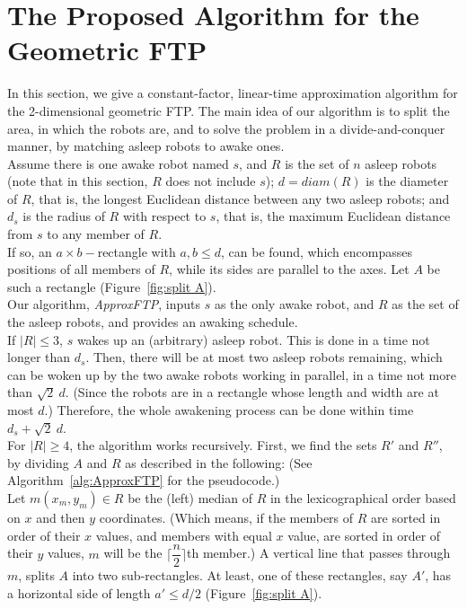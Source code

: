 \documentclass[review]{elsarticle}
\begin{document}
\section{The Proposed Algorithm for the Geometric FTP}
In this section, we give a constant-factor, linear-time approximation algorithm for the 2-dimensional geometric FTP. The main idea of our algorithm is to split the area, in which the robots are, and to solve the problem in a divide-and-conquer manner, by matching asleep robots to awake ones.\\
Assume there is one awake robot named $s$, and $R$ is the set of $n$ asleep robots (note that in this section, $R$ does not include $s$); $d=diam(R)$ is the diameter of $R$, that is, the longest Euclidean distance between any two asleep robots; and $d_s$ is the radius of $R$ with respect to $s$, that is, the maximum Euclidean distance from $s$ to any member of $R$.\\
If so, an $a\times b-$rectangle with $a,b\leq d$, can be found, which encompasses positions of all members of $R$, while its sides are parallel to the axes. Let $A$ be such a rectangle (Figure~\ref{fig:split A}). \\
Our algorithm, {\em ApproxFTP}, inputs $s$ as the only awake robot, and $R$ as the set of the asleep robots, and provides an awaking schedule.\\
If $|R|\leq 3$, $s$ wakes up an (arbitrary) asleep robot. This is done in a time not longer than $d_s$. Then, there will be at most two asleep robots remaining, which can be woken up by the two awake robots working in parallel, in a time not more than $\sqrt{2}~d$. (Since the robots are in a rectangle whose length and width are at most $d$.) Therefore, the whole awakening process can be done within time $d_s+\sqrt{2}~d$.\\
For $|R|\geq 4$, the algorithm works recursively. First, we find the sets $R'$ and $R''$, by dividing $A$ and $R$ as described in the following:  (See Algorithm~\ref{alg:ApproxFTP} for the pseudocode.)\\
Let $m(x_{m},y_{m})\in R$ be the (left) median of $R$ in the lexicographical order based on $x$ and then $y$ coordinates. (Which means, if the members of $R$ are sorted in order of their $x$ values, and members with equal $x$ value, are sorted in order of their $y$ values, $m$ will be the $\lceil\dfrac{n}{2}\rceil$th member.) A vertical line that passes through $m$, splits $A$ into two sub-rectangles. At least, one of these rectangles, say $A'$, has a horizontal side of length $a'\leq d/2$ (Figure~\ref{fig:split A}).\\
\end{document}
